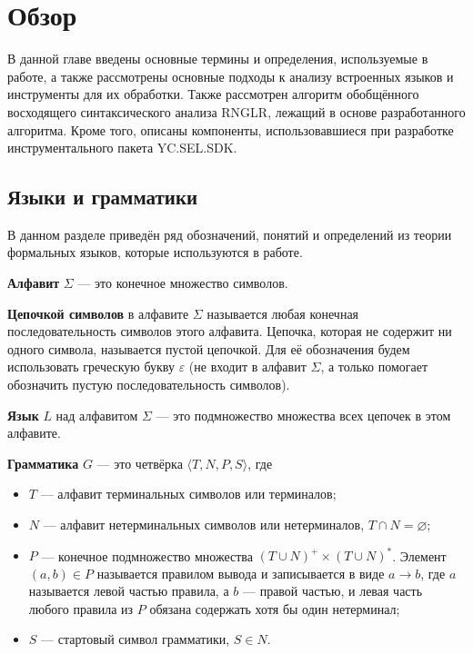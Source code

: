 \chapter{Обзор} \label{relWorks}

В данной главе введены основные термины и определения, используемые в работе, а также рассмотрены основные подходы к анализу встроенных языков и инструменты для их обработки. Также рассмотрен алгоритм обобщённого восходящего синтаксического анализа RNGLR, лежащий в основе разработанного алгоритма. Кроме того, описаны компоненты, использовавшиеся при разработке инструментального пакета YC.SEL.SDK.

\section{Языки и грамматики}

В данном разделе приведён ряд обозначений, понятий и определений из теории формальных языков, которые используются в работе.

\begin{mydef}
    \textbf{Алфавит} $\Sigma$ --- это конечное множество символов.
\end{mydef}

\begin{mydef}
    \textbf{Цепочкой символов} в алфавите $\Sigma$ называется любая конечная последовательность символов этого алфавита. Цепочка, которая не содержит ни одного символа, называется пустой цепочкой. Для её обозначения будем использовать греческую букву $\varepsilon$ (не входит в алфавит $\Sigma$, а только помогает обозначить пустую последовательность символов).
\end{mydef}

\begin{mydef}
    \textbf{Язык} $L$ над алфавитом $\Sigma$ --- это подмножество множества всех цепочек в этом алфавите.
\end{mydef}

\begin{mydef} 
    \textbf{Грамматика} $G$ --- это четвёрка  $\langle T, N, P, S \rangle$, где 
    \begin{itemize}
        \item $T$ --- алфавит терминальных символов или терминалов; 
        \item $N$ --- алфавит нетерминальных символов или нетерминалов, $T \cap N=\varnothing$; 
        \item $P$ --- конечное подмножество множества $(T \cup N)^+ \times (T \cup N)^*$.  Элемент $(a, b) \in P$ называется правилом вывода и записывается в виде $a \rightarrow b$, где $a$ называется левой частью правила, а $b$ --- правой частью, и левая часть любого правила из $P$ обязана содержать хотя бы один нетерминал; 
        \item $S$ --- стартовый символ грамматики, $S  \in N$. 
    \end{itemize}
\end{mydef}

